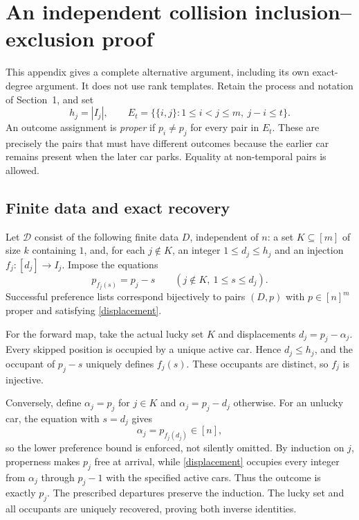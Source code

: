 \documentclass[11pt]{article}
\theoremstyle{definition}
\newcommand{\D}{\mathcal D}
\begin{document}
\appendix
\section{An independent collision inclusion--exclusion proof}
This appendix gives a complete alternative argument, including its own exact-degree argument. It does not use rank templates. Retain the process and notation of Section~1, and set
\[
 h_j=|I_j|,\qquad
 E_t=\{\{i,j\}:1\le i<j\le m,\ j-i\le t\}.
\]
An outcome assignment is \emph{proper} if $p_i\ne p_j$ for every pair in $E_t$. These are precisely the pairs that must have different outcomes because the earlier car remains present when the later car parks. Equality at non-temporal pairs is allowed.

\subsection{Finite data and exact recovery}
Let $\D$ consist of the following finite data $D$, independent of $n$: a set $K\subseteq[m]$ of size $k$ containing $1$, and, for each $j\notin K$, an integer $1\le d_j\le h_j$ and an injection $f_j:[d_j]\longrightarrow I_j$. Impose the equations
\begin{equation}\label{displacement}
 p_{f_j(s)}=p_j-s\qquad(j\notin K,\ 1\le s\le d_j).
\end{equation}
Successful preference lists correspond bijectively to pairs $(D,p)$ with $p\in[n]^m$ proper and satisfying \eqref{displacement}.

For the forward map, take the actual lucky set $K$ and displacements $d_j=p_j-\alpha_j$. Every skipped position is occupied by a unique active car. Hence $d_j\le h_j$, and the occupant of $p_j-s$ uniquely defines $f_j(s)$. These occupants are distinct, so $f_j$ is injective.

Conversely, define $\alpha_j=p_j$ for $j\in K$ and $\alpha_j=p_j-d_j$ otherwise. For an unlucky car, the equation with $s=d_j$ gives
\[
 \alpha_j=p_{f_j(d_j)}\in[n],
\]
so the lower preference bound is enforced, not silently omitted. By induction on $j$, properness makes $p_j$ free at arrival, while \eqref{displacement} occupies every integer from $\alpha_j$ through $p_j-1$ with the specified active cars. Thus the outcome is exactly $p_j$. The prescribed departures preserve the induction. The lucky set and all occupants are uniquely recovered, proving both inverse identities.
\end{document}
